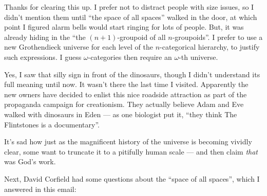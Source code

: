 \documentclass{article}
\begin{document}
Thanks for clearing this up. I prefer not to distract people with size
issues, so I didn't mention them until ``the space of all spaces''
walked in the door, at which point I figured alarm bells would start
ringing for lots of people. But, it was already hiding in the ``the
\((n+1)\)-groupoid of all \(n\)-groupoids''. I prefer to use a new
Grothendieck universe for each level of the \(n\)-categorical hierarchy,
to justify such expressions. I guess \(\omega\)-categories then require
an \(\omega\)-th universe.

Yes, I saw that silly sign in front of the dinosaurs, though I didn't
understand its full meaning until now. It wasn't there the last time I
visited. Apparently the new owners have decided to enlist this nice
roadside attraction as part of the propaganda campaign for creationism.
They actually believe Adam and Eve walked with dinosaurs in Eden --- as
one biologist put it, ``they think The Flintstones is a documentary''.

It's sad how just as the magnificent history of the universe is becoming
vividly clear, some want to truncate it to a pitifully human scale ---
and then claim \emph{that} was God's work.

Next, David Corfield had some questions about the ``space of all
spaces'', which I answered in this email:
\end{document}
